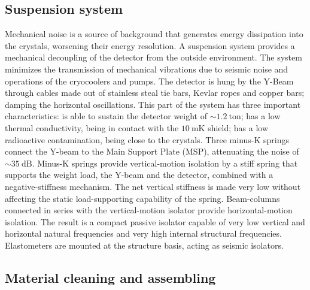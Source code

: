 \documentclass[12pt]{article}
\begin{document}
\subsection{Suspension system}

Mechanical noise is a source of background that generates energy dissipation into the crystals, worsening their energy resolution. A suspension system provides a mechanical decoupling of the detector from the outside environment. The system minimizes the transmission of mechanical vibrations due to seismic noise and operations of the cryocoolers and pumps. The detector is hung by the Y-Beam through cables made out of stainless steal tie bars, Kevlar ropes and copper bars; damping the horizontal oscillations. This part of the system has three important characteristics: is able to sustain the detector weight of $\sim 1.2~\mathrm{ton}$; has a low thermal conductivity, being in contact with the $10~\mathrm{mK}$ shield; has a low radioactive contamination, being close to the crystals. Three minus-K springs connect the Y-beam to the Main Support Plate (MSP), attenuating the noise of $\sim 35~\mathrm{dB}$.  Minus-K springs provide vertical-motion isolation by a stiff spring that supports the weight load, the Y-beam and the detector, combined with a negative-stiffness mechanism. The net vertical stiffness is made very low without affecting the static load-supporting capability of the spring. Beam-columns connected in series with the vertical-motion isolator provide horizontal-motion isolation. The result is a compact passive isolator capable of very low vertical and horizontal natural frequencies and very high internal structural frequencies. Elastometers are mounted at the structure basis, acting as seismic isolators.

\subsection{Material cleaning and assembling}
\end{document}
